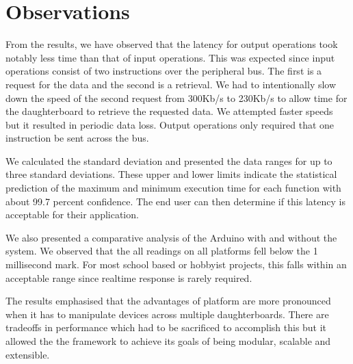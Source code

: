 

\section{Observations} %
\label{sec:Observations}

From the results, we have observed that the latency for output operations took notably less time than that of input operations. This was expected since input operations consist of two instructions over the peripheral bus. The first is a request for the data and the second is a retrieval. We had to intentionally slow down the speed of the second request from 300Kb/s to 230Kb/s to allow time for the daughterboard to retrieve the requested data. We attempted faster speeds but it resulted in periodic data loss. Output operations only required that one instruction be sent across the bus.

We calculated the standard deviation and presented the data ranges for up to three standard deviations. These upper and lower limits indicate the statistical prediction of the maximum and minimum execution time for each function with about 99.7 percent confidence. The end user can then determine if this latency is acceptable for their application.

We also presented a comparative analysis of the Arduino with and without the \xten system. We observed that the all readings on all platforms fell below the 1 millisecond mark. For most school based or hobbyist projects, this falls within an acceptable range since realtime response is rarely required.

The results emphasised that the advantages of \xten platform are more pronounced when it has to manipulate devices across multiple daughterboards. There are tradeoffs in performance which had to be sacrificed to accomplish this but it allowed the the framework to achieve its goals of being modular, scalable and extensible.
